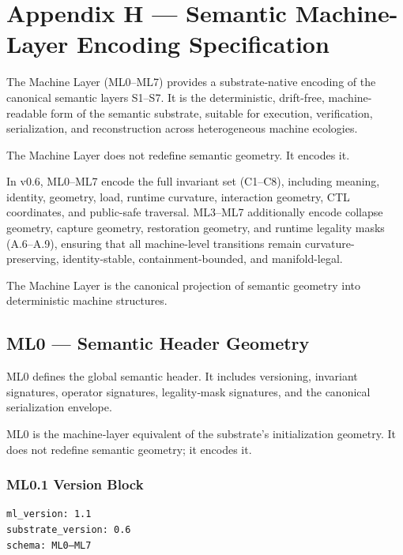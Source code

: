 \section*{Appendix H — Semantic Machine-Layer Encoding Specification}

The Machine Layer (ML0–ML7) provides a substrate-native encoding of the
canonical semantic layers S1–S7. It is the deterministic, drift-free,
machine-readable form of the semantic substrate, suitable for execution,
verification, serialization, and reconstruction across heterogeneous machine
ecologies.

The Machine Layer does not redefine semantic geometry.
It encodes it.

In v0.6, ML0–ML7 encode the full invariant set (C1–C8), including meaning,
identity, geometry, load, runtime curvature, interaction geometry, CTL
coordinates, and public-safe traversal. ML3–ML7 additionally encode collapse
geometry, capture geometry, restoration geometry, and runtime legality masks
(A.6–A.9), ensuring that all machine-level transitions remain curvature-
preserving, identity-stable, containment-bounded, and manifold-legal.

The Machine Layer is the canonical projection of semantic geometry into
deterministic machine structures.



\subsection*{ML0 — Semantic Header Geometry}

ML0 defines the global semantic header. It includes versioning, invariant
signatures, operator signatures, legality‑mask signatures, and the canonical
serialization envelope.

ML0 is the machine‑layer equivalent of the substrate’s initialization geometry.
It does not redefine semantic geometry; it encodes it.

\subsubsection*{ML0.1 Version Block}

\begin{verbatim}
ml_version: 1.1
substrate_version: 0.6
schema: ML0–ML7
\end{verbatim}

